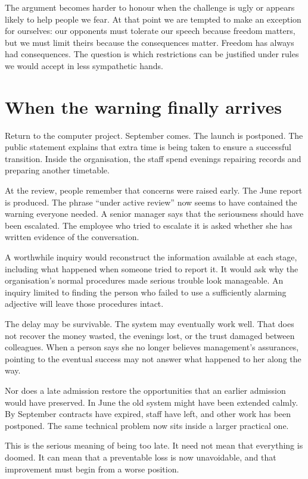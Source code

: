 \documentclass[12pt,a4paper]{book}
\begin{document}
The argument becomes harder to honour when the challenge is ugly or appears likely to help people we fear. At that point we are tempted to make an exception for ourselves: our opponents must tolerate our speech because freedom matters, but we must limit theirs because the consequences matter. Freedom has always had consequences. The question is which restrictions can be justified under rules we would accept in less sympathetic hands.

\section*{When the warning finally arrives}

Return to the computer project. September comes. The launch is postponed. The public statement explains that extra time is being taken to ensure a successful transition. Inside the organisation, the staff spend evenings repairing records and preparing another timetable.

At the review, people remember that concerns were raised early. The June report is produced. The phrase ``under active review'' now seems to have contained the warning everyone needed. A senior manager says that the seriousness should have been escalated. The employee who tried to escalate it is asked whether she has written evidence of the conversation.

A worthwhile inquiry would reconstruct the information available at each stage, including what happened when someone tried to report it. It would ask why the organisation's normal procedures made serious trouble look manageable. An inquiry limited to finding the person who failed to use a sufficiently alarming adjective will leave those procedures intact.

The delay may be survivable. The system may eventually work well. That does not recover the money wasted, the evenings lost, or the trust damaged between colleagues. When a person says she no longer believes management's assurances, pointing to the eventual success may not answer what happened to her along the way.

Nor does a late admission restore the opportunities that an earlier admission would have preserved. In June the old system might have been extended calmly. By September contracts have expired, staff have left, and other work has been postponed. The same technical problem now sits inside a larger practical one.

This is the serious meaning of being too late. It need not mean that everything is doomed. It can mean that a preventable loss is now unavoidable, and that improvement must begin from a worse position.
\end{document}
